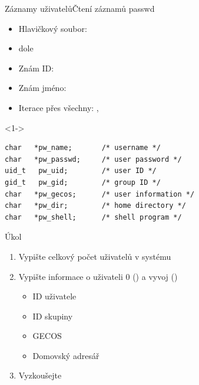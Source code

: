 \begin{frame}[fragile]{Záznamy uživatelů}{Čtení záznamů passwd}

  \begin{itemize}
    \item Hlavičkový soubor: 
    \item {} dole

    \pause

    \item Znám ID: 
    \item Znám jméno: 

    \pause

    \item Iterace přes všechny: ,
  \end{itemize}

  \begin{uncoverenv}<1->
  \begin{block}{}
  \begin{lstlisting}
char   *pw_name;       /* username */
char   *pw_passwd;     /* user password */
uid_t   pw_uid;        /* user ID */
gid_t   pw_gid;        /* group ID */
char   *pw_gecos;      /* user information */
char   *pw_dir;        /* home directory */
char   *pw_shell;      /* shell program */
  \end{lstlisting}
  \end{block}
  \end{uncoverenv}

\end{frame}

\begin{frame}{Úkol}

  \begin{enumerate}
    \item Vypište celkový počet uživatelů v systému
    \item Vypište informace o uživateli 0 () a vyvoj
      ()
    \begin{itemize}
      \item ID uživatele
      \item ID skupiny
      \item GECOS
      \item Domovský adresář
    \end{itemize}

    \item Vyzkoušejte
  \end{enumerate}

\end{frame}

